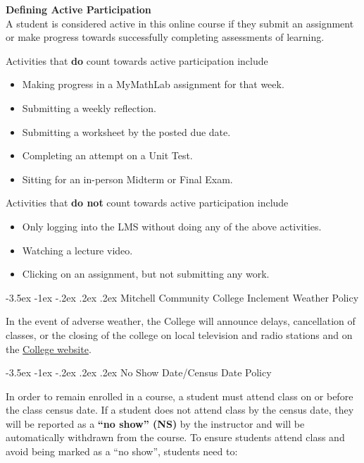 \documentclass{article}
\makeatletter
\renewcommand\section{\@startsection{section}{1}{0pt}%
  {-3.5ex \@plus -1ex \@minus -.2ex}%
  {.2ex \@plus.2ex}%
  {\normalfont\Large\bfseries}} %
\renewenvironment{framed}[1][]{%
  \def\FrameCommand{%
    \hspace{1pt}%
    {\color{mybordercolor}\vrule width 2pt} %
    \hspace{1pt}%
    \fboxsep=\FrameSep%
    \colorbox{mybgcolor}%
  }%
  \MakeFramed {\advance\hsize-\width \FrameRestore}%
}{%
  \endMakeFramed
}
\makeatother
\begin{document}
\begin{framed}
\textbf{Defining Active Participation}\\
A student is considered active in this online course if they submit an assignment or make progress towards successfully completing assessments of learning.

Activities that \textbf{do} count towards active participation include

\begin{itemize}
\item Making progress in a MyMathLab assignment for that week.
\item Submitting a weekly reflection.
\item Submitting a worksheet by the posted due date.
\item Completing an attempt on a Unit Test.
\item Sitting for an in-person Midterm or Final Exam.
\end{itemize}

Activities that \textbf{do not} count towards active participation include

\begin{itemize}
\item Only logging into the LMS without doing any of the above activities.
\item Watching a lecture video.
\item Clicking on an assignment, but not submitting any work.
\end{itemize}
\end{framed}

\section{Mitchell Community College Inclement Weather Policy}

In the event of adverse weather, the College will announce delays, cancellation of classes, or the closing of the college on local television and radio stations and on the \href{https://www.mitchellcc.edu}{College website}.

\section{No Show Date/Census Date Policy}

In order to remain enrolled in a course, a student must attend class on or before the class census date. If a student does not attend class by the census date, they will be reported as a \textbf{``no show'' (NS)} by the instructor and will be automatically withdrawn from the course.  To ensure students attend class and avoid being marked as a ``no show'', students need to:
\end{document}
